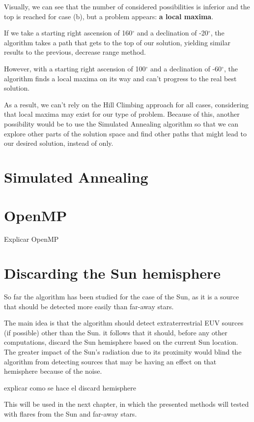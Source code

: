 Visually, we can see that the number of considered possibilities is inferior and the top is reached for case (b), but a problem appears: \textbf{a local maxima}.

If we take a starting right ascension of 160$^{\circ}$ and a declination of -20$^{\circ}$, the algorithm takes a path that gets to the top of our solution, yielding similar results to the previous, decrease range method.

However, with a starting right ascension of 100$^{\circ}$ and a declination of -60$^{\circ}$, the algorithm finds a local maxima on its way and can't progress to the real best solution.

As a result, we can't rely on the Hill Climbing approach for all cases, considering that local maxima may exist for our type of problem. Because of this, another possibility would be to use the Simulated Annealing algorithm so that we can explore other parts of the solution space and find other paths that might lead to our desired solution, instead of only.

\section{Simulated Annealing}

\section{OpenMP}

Explicar OpenMP

\section{Discarding the Sun hemisphere}

So far the algorithm has been studied for the case of the Sun, as it is a source that should be detected more easily than far-away stars. 

The main idea is that the algorithm should detect extraterrestrial EUV sources (if possible) other than the Sun. it follows that it should, before any other computations, discard the Sun hemisphere based on the current Sun location. The greater impact of the Sun's radiation due to its proximity would blind the algorithm from detecting sources that may be having an effect on that hemisphere because of the noise.


explicar como se hace el discard hemisphere

This will be used in the next chapter, in which the presented methods will tested with flares from the Sun and far-away stars.